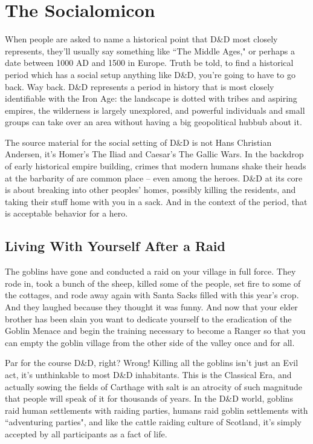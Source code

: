 
\section{The Socialomicon} %
\vspace*{-10pt}

When people are asked to name a historical point that D\&D most closely represents, they'll usually say something like ``The Middle Ages," or perhaps a date between 1000 AD and 1500 in Europe. Truth be told, to find a historical period which has a social setup anything like D\&D, you're going to have to go back. Way back. D\&D represents a period in history that is most closely identifiable with the Iron Age: the landscape is dotted with tribes and aspiring empires, the wilderness is largely unexplored, and powerful individuals and small groups can take over an area without having a big geopolitical hubbub about it.

The source material for the social setting of D\&D is not Hans Christian Andersen, it's Homer's The Iliad and Caesar's The Gallic Wars. In the backdrop of early historical empire building, crimes that modern humans shake their heads at the barbarity of are common place -- even among the heroes. D\&D at its core is about breaking into other peoples' homes, possibly killing the residents, and taking their stuff home with you in a sack. And in the context of the period, that is acceptable behavior for a hero.

\subsection{Living With Yourself After a Raid}

The goblins have gone and conducted a raid on your village in full force. They rode in, took a bunch of the sheep, killed some of the people, set fire to some of the cottages, and rode away again with Santa Sacks filled with this year's crop. And they laughed because they thought it was funny. And now that your elder brother has been slain you want to dedicate yourself to the eradication of the Goblin Menace and begin the training necessary to become a Ranger so that you can empty the goblin village from the other side of the valley once and for all.

Par for the course D\&D, right? Wrong! Killing all the goblins isn't just an Evil act, it's unthinkable to most D\&D inhabitants. This is the Classical Era, and actually sowing the fields of Carthage with salt is an atrocity of such magnitude that people will speak of it for thousands of years. In the D\&D world, goblins raid human settlements with raiding parties, humans raid goblin settlements with ``adventuring parties", and like the cattle raiding culture of Scotland, it's simply accepted by all participants as a fact of life.

